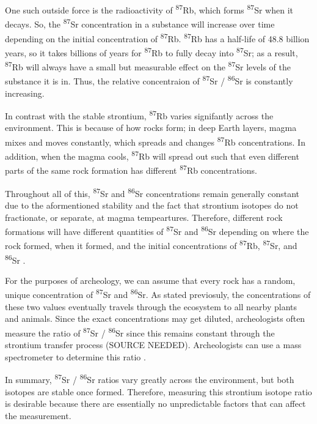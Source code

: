 \documentclass[a4paper, 12pt]{article}
\begin{document}
One such outside force is the radioactivity of \textsuperscript{87}Rb, which forms \textsuperscript{87}Sr when it decays. So, the \textsuperscript{87}Sr concentration in a substance
will increase over time depending on the initial concentration of \textsuperscript{87}Rb.
\textsuperscript{87}Rb has a half-life of 48.8 billion years, so it takes billions of years
for \textsuperscript{87}Rb to fully decay into \textsuperscript{87}Sr; as a result, \textsuperscript{87}Rb will always
have a small but measurable effect on the \textsuperscript{87}Sr levels of the substance it is in.
Thus, the relative concentraion of \textsuperscript{87}Sr / \textsuperscript{86}Sr is constantly increasing.

In contrast with the stable strontium, \textsuperscript{87}Rb varies signifantly across the environment.
This is because of how rocks form; in deep Earth layers, magma mixes and moves constantly, which spreads and changes \textsuperscript{87}Rb concentrations.
In addition, when the magma cools,
\textsuperscript{87}Rb will spread out such that even different parts of the same
rock formation has different \textsuperscript{87}Rb concentrations.

Throughout all of this, \textsuperscript{87}Sr and \textsuperscript{86}Sr concentrations remain
generally constant due to the aformentioned stability and the fact that strontium isotopes
do not fractionate, or separate, at magma tempeartures.
Therefore, different rock formations will have different quantities of
\textsuperscript{87}Sr and \textsuperscript{86}Sr depending on where the rock formed,
when it formed, and the initial concentrations of \textsuperscript{87}Rb, \textsuperscript{87}Sr, and \textsuperscript{86}Sr \citep{Long1998}.

For the purposes of archeology, we can assume that every rock has a random, unique
concentration of \textsuperscript{87}Sr and \textsuperscript{86}Sr. As stated previosuly,
the concentrations of these two values eventually travels through the ecosystem to all nearby
plants and animals. Since the exact concentrations may get diluted, archeologists often
measure the ratio of \textsuperscript{87}Sr / \textsuperscript{86}Sr since this
remains constant through the strontium transfer process (SOURCE NEEDED). Archeologists
can use a mass spectrometer to determine this ratio \citep{Long1998}.

In summary, \textsuperscript{87}Sr / \textsuperscript{86}Sr ratios vary greatly
across the environment, but both isotopes are stable once formed. Therefore, measuring this
strontium isotope ratio is desirable because there are essentially no unpredictable
factors that can affect the measurement.
\end{document}
